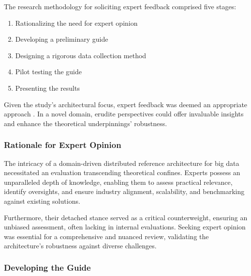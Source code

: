 \documentclass{ieeeaccess}
\begin{document}
The research methodology for soliciting expert feedback comprised five stages: \begin{enumerate}[label=\alph*)]

  \item Rationalizing the need for expert opinion

  \item Developing a preliminary guide

  \item Designing a rigorous data collection method

  \item Pilot testing the guide

  \item Presenting the results

  \end{enumerate}

  

  Given the study's architectural focus, expert feedback was deemed an appropriate approach \citep{creswell2007qualitative}. In a novel domain, erudite perspectives could offer invaluable insights and enhance the theoretical underpinnings' robustness.

  

  \subsubsection{Rationale for Expert Opinion}

  

  The intricacy of a domain-driven distributed reference architecture for big data necessitated an evaluation transcending theoretical confines. Experts possess an unparalleled depth of knowledge, enabling them to assess practical relevance, identify oversights, and ensure industry alignment, scalability, and benchmarking against existing solutions.

  

  Furthermore, their detached stance served as a critical counterweight, ensuring an unbiased assessment, often lacking in internal evaluations. Seeking expert opinion was essential for a comprehensive and nuanced review, validating the architecture's robustness against diverse challenges.

  

  \subsubsection{Developing the Guide}
\end{document}
